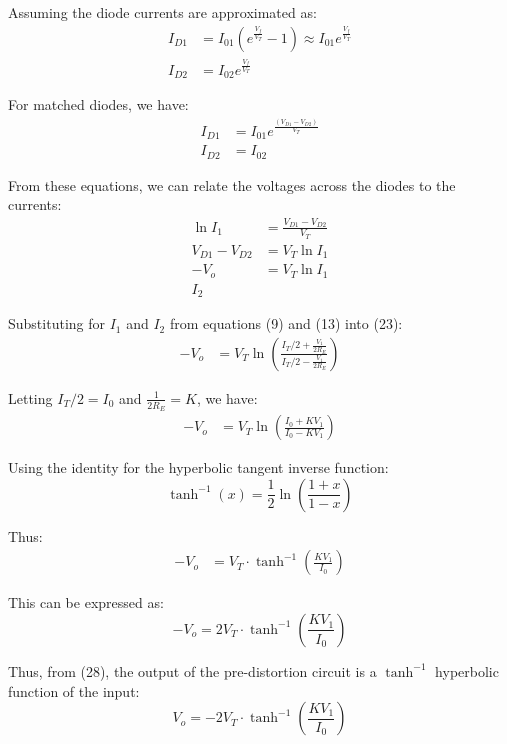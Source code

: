 \documentclass[a4paper,9pt,twoside,openany,twocolumn]{memoir}
\begin{document}
Assuming the diode currents are approximated as:
\begin{align*}
I_{D1} &= I_{01}\left(e^{\frac{V_f}{V_T}} - 1\right) \approx I_{01} e^{\frac{V_f}{V_T}} \tag{17} \\
I_{D2} &= I_{02} e^{\frac{V_f}{V_T}} \tag{18}
\end{align*}

For matched diodes, we have:
\begin{align*}
I_{D1} &= I_{01} e^{\frac{(V_{D1} - V_{D2})}{V_T}} \tag{19} \\
I_{D2} &= I_{02} \tag{20}
\end{align*}

From these equations, we can relate the voltages across the diodes to the currents:
\begin{align*}
\ln I_1 &= \frac{V_{D1} - V_{D2}}{V_T} \tag{21} \\
V_{D1} - V_{D2} &= V_T \ln I_1 \tag{22} \\
-V_o &= V_T \ln I_1 \tag{23} \\
I_2
\end{align*}

Substituting for \(I_1\) and \(I_2\) from equations (9) and (13) into (23):
\begin{align*}
-V_o &= V_T \ln\left(\frac{I_T/2 + \frac{V_1}{2R_E}}{I_T/2 - \frac{V_1}{2R_E}}\right) \tag{24}
\end{align*}

Letting \(I_T/2 = I_0\) and \(\frac{1}{2R_E} = K\), we have:
\begin{align*}
-V_o &= V_T \ln\left(\frac{I_0 + KV_1}{I_0 - KV_1}\right) \tag{25}
\end{align*}

Using the identity for the hyperbolic tangent inverse function:
\[
\tanh^{-1}(x) = \frac{1}{2} \ln\left(\frac{1 + x}{1 - x}\right) \tag{26}
\]

Thus:
\begin{align*}
-V_o &= V_T \cdot \tanh^{-1}\left(\frac{KV_1}{I_0}\right) \tag{27}
\end{align*}

This can be expressed as:
\[
-V_o = 2V_T \cdot \tanh^{-1}\left(\frac{KV_1}{I_0}\right) \tag{28}
\]

Thus, from (28), the output of the pre-distortion circuit is a \(\tanh^{-1}\) hyperbolic function of the input:
\[
V_o = -2V_T \cdot \tanh^{-1}\left(\frac{KV_1}{I_0}\right) \tag{29}
\]
\end{document}
